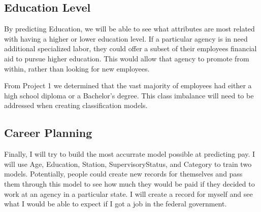 \documentclass{article}
\begin{document}
    \subsection{Education Level}
    By predicting Education, we will be able to see what attributes are most related with having a higher or lower education level. If a particular agency is in need additional specialized labor, they could offer a subset of their employees financial aid to pursue higher education. This would allow that agency to promote from within, rather than looking for new employees.
    \par
    From Project 1 we determined that the vast majority of employees had either a high school diploma or a Bachelor's degree. This class imbalance will need to be addressed when creating classification models.\cite{proj1}

    \subsection{Career Planning}
    Finally, I will try to build the most accurrate model possible at predicting pay. I will use Age, Education, Station, SupervisoryStatus, and Category to train two models. Potentially, people could create new records for themselves and pass them through this model to see how much they would be paid if they decided to work at an agency in a particular state. I will create a record for myself and see what I would be able to expect if I got a job in the federal government.
\end{document}
